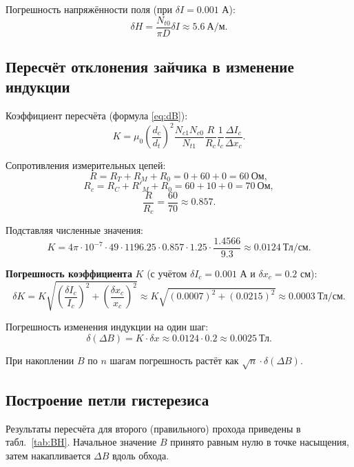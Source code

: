 \documentclass[a4paper]{article}
\begin{document}
Погрешность напряжённости поля (при $\delta I = 0.001$ А):
\[
\delta H = \frac{N_{t0}}{\pi D} \delta I \approx 5.6 \ \text{А/м}.
\]

\subsection{Пересчёт отклонения зайчика в изменение индукции}

Коэффициент пересчёта (формула \eqref{eq:dB}):
\[
K = \mu_0 \left(\frac{d_c}{d_t}\right)^2 \frac{N_{c1} N_{c0}}{N_{t1}} \frac{R}{R_c} \frac{1}{l_c} \frac{\Delta I_c}{\Delta x_c}.
\]

Сопротивления измерительных цепей:
\[
R = R_T + R_M + R_0 = 0 + 60 + 0 = 60 \ \text{Ом},
\]
\[
R_c = R_C + R'_M + R_0 = 60 + 10 + 0 = 70 \ \text{Ом},
\]
\[
\frac{R}{R_c} = \frac{60}{70} \approx 0.857.
\]

Подставляя численные значения:
\[
K = 4\pi \!\cdot\! 10^{-7} \cdot 49 \cdot 1196.25 \cdot 0.857 \cdot 1.25 \cdot \frac{1.4566}{9.3} \approx 0.0124 \ \text{Тл/см}.
\]

\textbf{Погрешность коэффициента} $K$ (с учётом $\delta I_c = 0.001$ А и $\delta x_c = 0.2$ см):
\[
\delta K = K \sqrt{\left(\frac{\delta I_c}{I_c}\right)^2 + \left(\frac{\delta x_c}{x_c}\right)^2} \approx K \sqrt{(0.0007)^2 + (0.0215)^2} \approx 0.0003 \ \text{Тл/см}.
\]

Погрешность изменения индукции на один шаг:
\[
\delta(\Delta B) = K \cdot \delta x \approx 0.0124 \cdot 0.2 \approx 0.0025 \ \text{Тл}.
\]

При накоплении $B$ по $n$ шагам погрешность растёт как $\sqrt{n} \cdot \delta(\Delta B)$.

\subsection{Построение петли гистерезиса}

Результаты пересчёта для второго (правильного) прохода приведены в табл.~\ref{tab:BH}. Начальное значение $B$ принято равным нулю в точке насыщения, затем накапливается $\Delta B$ вдоль обхода.
\end{document}
